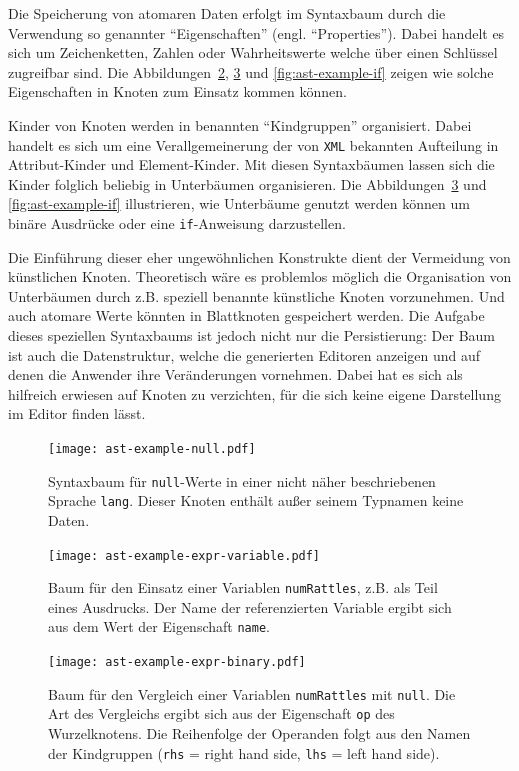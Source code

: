 \documentclass[paper=a4,fontsize=11pt,parskip=half]{scrartcl}
\begin{document}
Die Speicherung von atomaren Daten erfolgt im Syntaxbaum durch die Verwendung so genannter \enquote{Eigenschaften} (engl. \enquote{Properties}). Dabei handelt es sich um Zeichenketten, Zahlen oder Wahrheitswerte welche über einen Schlüssel zugreifbar sind. Die Abbildungen~\ref{fig:ast-example-variable}, \ref{fig:ast-example-binary} und \ref{fig:ast-example-if} zeigen wie solche Eigenschaften in Knoten zum Einsatz kommen können.

Kinder von Knoten werden in benannten \enquote{Kindgruppen} organisiert. Dabei handelt es sich um eine Verallgemeinerung der von \texttt{XML} bekannten Aufteilung in Attribut-Kinder und Element-Kinder. Mit diesen Syntaxbäumen lassen sich die Kinder folglich beliebig in Unterbäumen organisieren. Die Abbildungen~\ref{fig:ast-example-binary} und \ref{fig:ast-example-if} illustrieren, wie Unterbäume genutzt werden können um binäre Ausdrücke oder eine \texttt{if}-Anweisung darzustellen.

Die Einführung dieser eher ungewöhnlichen Konstrukte dient der Vermeidung von künstlichen Knoten. Theoretisch wäre es problemlos möglich die Organisation von Unterbäumen durch z.B. speziell benannte künstliche Knoten vorzunehmen. Und auch atomare Werte könnten in Blattknoten gespeichert werden. Die Aufgabe dieses speziellen Syntaxbaums ist jedoch nicht nur die Persistierung: Der Baum ist auch die Datenstruktur, welche die generierten Editoren anzeigen und auf denen die Anwender ihre Veränderungen vornehmen. Dabei hat es sich als hilfreich erwiesen auf Knoten zu verzichten, für die sich keine eigene Darstellung im Editor finden lässt.

\begin{figure}[p]
  \centering\texttt{[image: ast-example-null.pdf]}
  \caption{Syntaxbaum für \texttt{null}-Werte in einer nicht näher beschriebenen Sprache \texttt{lang}. Dieser Knoten enthält außer seinem Typnamen keine Daten.}
  \label{fig:ast-example-null}
\end{figure}

\begin{figure}[p]
  \centering\texttt{[image: ast-example-expr-variable.pdf]}
  \caption{Baum für den Einsatz einer Variablen \texttt{numRattles}, z.B. als Teil eines Ausdrucks. Der Name der referenzierten Variable ergibt sich aus dem Wert der Eigenschaft \texttt{name}.}
  \label{fig:ast-example-variable}
\end{figure}

\begin{figure}[p]
  \centering\texttt{[image: ast-example-expr-binary.pdf]}
  \caption{Baum für den Vergleich einer Variablen \texttt{numRattles} mit \texttt{null}. Die Art des Vergleichs ergibt sich aus der Eigenschaft \texttt{op} des Wurzelknotens. Die Reihenfolge der Operanden folgt aus den Namen der Kindgruppen (\texttt{rhs} = right hand side, \texttt{lhs} = left hand side).}
  \label{fig:ast-example-binary}
\end{figure}
\end{document}
